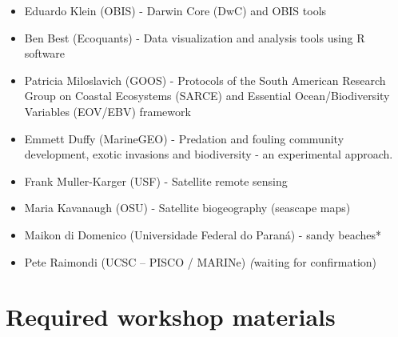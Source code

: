 \documentclass[]{book}
\providecommand{\tightlist}{%
  \setlength{\itemsep}{0pt}\setlength{\parskip}{0pt}}
\theoremstyle{definition}
\theoremstyle{definition}
\theoremstyle{definition}
\theoremstyle{remark}
\begin{document}
\begin{itemize}
\tightlist
\item
  Eduardo Klein (OBIS) - Darwin Core (DwC) and OBIS tools
\item
  Ben Best (Ecoquants) - Data visualization and analysis tools using R
  software
\item
  Patricia Miloslavich (GOOS) - Protocols of the South American Research
  Group on Coastal Ecosystems (SARCE) and Essential Ocean/Biodiversity
  Variables (EOV/EBV) framework
\item
  Emmett Duffy (MarineGEO) - Predation and fouling community
  development, exotic invasions and biodiversity - an experimental
  approach.
\item
  Frank Muller-Karger (USF) - Satellite remote sensing
\item
  Maria Kavanaugh (OSU) - Satellite biogeography (seascape maps)
\item
  Maikon di Domenico (Universidade Federal do Paraná) - sandy beaches*
\item
  Pete Raimondi (UCSC -- PISCO / MARINe)\emph{ (}waiting for
  confirmation)
\end{itemize}

\hypertarget{required-workshop-materials}{%
\section{Required workshop
materials}\label{required-workshop-materials}}
\end{document}
